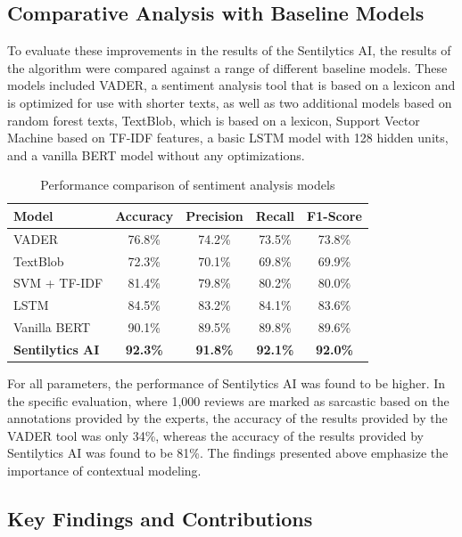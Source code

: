 \documentclass[11pt,a4paper]{article}
\begin{document}
\subsection{Comparative Analysis with Baseline Models}

To evaluate these improvements in the results of the Sentilytics AI, the results of the algorithm were compared against a range of different baseline models. These models included VADER, a sentiment analysis tool that is based on a lexicon and is optimized for use with shorter texts, as well as two additional models based on random forest texts, TextBlob, which is based on a lexicon, Support Vector Machine based on TF-IDF features, a basic LSTM model with 128 hidden units, and a vanilla BERT model without any optimizations.

\begin{table}[H]
\centering
\caption{Performance comparison of sentiment analysis models}
\label{tab:comparison}
\begin{tabular}{|l|c|c|c|c|}
\hline
\textbf{Model} & \textbf{Accuracy} & \textbf{Precision} & \textbf{Recall} & \textbf{F1-Score} \\
\hline
VADER & 76.8\% & 74.2\% & 73.5\% & 73.8\% \\
TextBlob & 72.3\% & 70.1\% & 69.8\% & 69.9\% \\
SVM + TF-IDF & 81.4\% & 79.8\% & 80.2\% & 80.0\% \\
LSTM & 84.5\% & 83.2\% & 84.1\% & 83.6\% \\
Vanilla BERT & 90.1\% & 89.5\% & 89.8\% & 89.6\% \\
\textbf{Sentilytics AI} & \textbf{92.3\%} & \textbf{91.8\%} & \textbf{92.1\%} & \textbf{92.0\%} \\
\hline
\end{tabular}
\end{table}

For all parameters, the performance of Sentilytics AI was found to be higher. In the specific evaluation, where 1,000 reviews are marked as sarcastic based on the annotations provided by the experts, the accuracy of the results provided by the VADER tool was only
34\%, whereas the accuracy of the results provided by Sentilytics AI was found to be 81\%. The findings presented above emphasize the importance of contextual modeling.


\subsection{Key Findings and Contributions}
\end{document}
